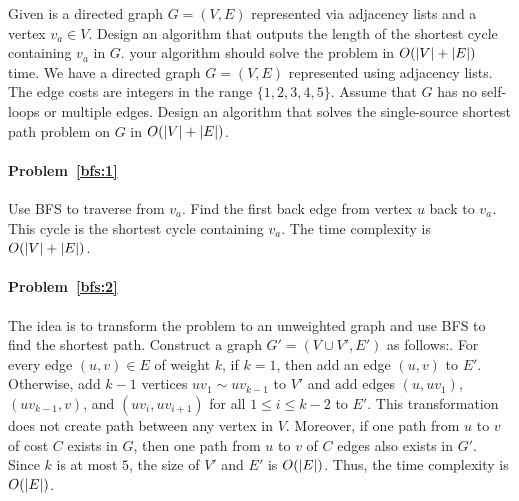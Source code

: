 \begin{Exercise}
\Question Given is a directed graph $G = (V, E)$ represented via adjacency lists and a vertex $v_a \in V$. Design an algorithm that outputs the length of the shortest cycle containing $v_a$ in $G$. your algorithm should solve the problem in $O(\lvert V\rvert + \lvert E\rvert)$ time. \label{bfs:1}
\Question We have a directed graph $G = (V, E)$ represented using adjacency lists. The edge costs are integers in the range $\{1, 2, 3, 4, 5\}$. Assume that $G$ has no self-loops or multiple edges. Design an algorithm that solves the single-source shortest path problem on $G$ in $O(\lvert V\rvert+\lvert E\rvert)$. \label{bfs:2}
\end{Exercise}
\begin{Answer}
\paragraph{Problem~\ref{bfs:1}}
Use BFS to traverse from $v_a$. Find the first back edge from vertex $u$ back to $v_a$. This cycle is the shortest cycle containing $v_a$. The time complexity is $O(\lvert V\rvert + \lvert E\rvert)$.

\paragraph{Problem~\ref{bfs:2}}
The idea is to transform the problem to an unweighted graph and use BFS to find the shortest path. Construct a graph $G' = (V \cup V', E')$ as follows:. For every edge $(u, v) \in E$ of weight $k$, if $k = 1$, then add an edge $(u, v)$ to $E'$. Otherwise, add $k-1$ vertices $uv_1 \sim uv_{k-1}$ to $V'$ and add edges $(u, uv_1)$, $(uv_{k-1}, v)$, and $(uv_i, uv_{i+1})$ for all $1 \leq i \leq k-2$ to $E'$. This transformation does not create path between any vertex in $V$. Moreover, if one path from $u$ to $v$ of cost $C$ exists in $G$, then one path from $u$ to $v$ of $C$ edges also exists in $G'$. Since $k$ is at most $5$, the size of $V'$ and $E'$ is $O(\lvert E\rvert)$. Thus, the time complexity is $O(\lvert E\rvert)$.
\end{Answer}

